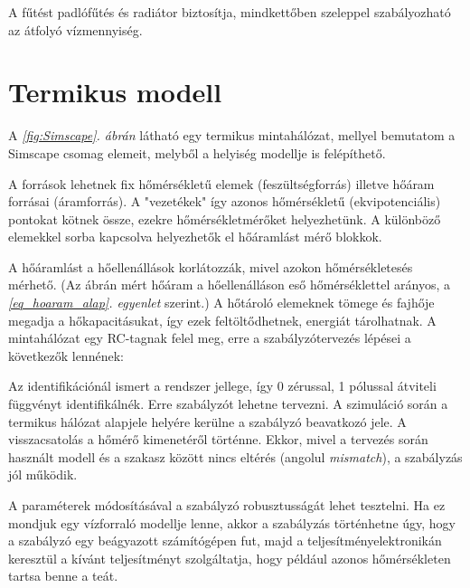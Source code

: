 A fűtést padlófűtés és radiátor biztosítja, mindkettőben szeleppel szabályozható az átfolyó vízmennyiség.

\section{Termikus modell}

A \textit{\ref{fig:Simscape}. ábrán} látható egy termikus mintahálózat, mellyel bemutatom a Simscape csomag elemeit, melyből a helyiség modellje is felépíthető.

A források lehetnek fix hőmérsékletű elemek (feszültségforrás) illetve hőáram forrásai (áramforrás).
A "vezetékek" így azonos hőmérsékletű (ekvipotenciális) pontokat kötnek össze, ezekre hőmérsékletmérőket helyezhetünk. A különböző elemekkel sorba kapcsolva helyezhetők el hőáramlást mérő blokkok.

A hőáramlást a hőellenállások korlátozzák, mivel azokon hőmérsékletesés mérhető. (Az ábrán mért hőáram a hőellenálláson eső hőmérséklettel arányos, a \textit{\ref{eq_hoaram_alap}. egyenlet} szerint.) A hőtároló elemeknek tömege és fajhője megadja a hőkapacitásukat, így ezek feltöltődhetnek, energiát tárolhatnak. A mintahálózat egy RC-tagnak felel meg, erre a szabályzótervezés lépései a következők lennének:

Az identifikációnál ismert a rendszer jellege, így 0 zérussal, 1 pólussal átviteli függvényt identifikálnék.
Erre szabályzót lehetne tervezni. A szimuláció során a termikus hálózat alapjele helyére kerülne a szabályzó beavatkozó jele. A visszacsatolás a hőmérő kimenetéről történne. Ekkor, mivel a tervezés során használt modell és a  szakasz között nincs eltérés (angolul \textit{mismatch}), a szabályzás jól működik.

A paraméterek módosításával a szabályzó robusztusságát lehet tesztelni. Ha ez mondjuk egy vízforraló modellje lenne, akkor a szabályzás történhetne úgy, hogy a szabályzó egy beágyazott számítógépen fut, majd a teljesítményelektronikán keresztül a kívánt teljesítményt szolgáltatja, hogy például azonos hőmérsékleten tartsa benne a teát.


